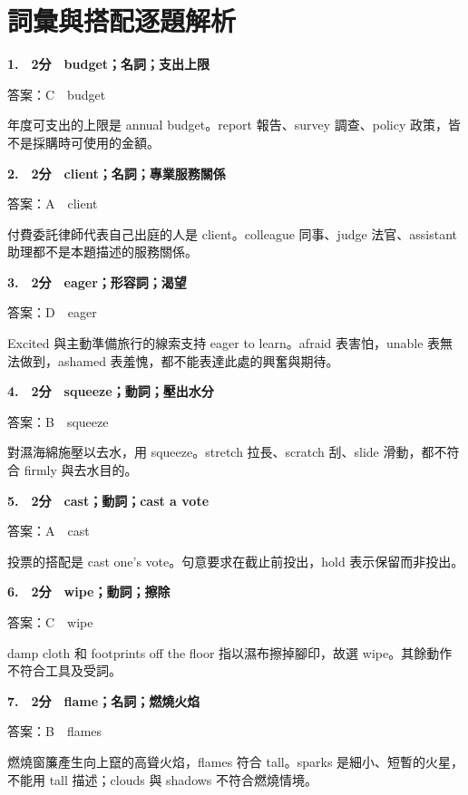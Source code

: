 \documentclass[11pt,a4paper]{article}
\begin{document}
\newpage
\section*{詞彙與搭配逐題解析}
\textbf{1.　2分　budget；名詞；支出上限}\par
答案：C　budget
\par\smallskip
年度可支出的上限是 annual budget。report 報告、survey 調查、policy 政策，皆不是採購時可使用的金額。
\par\smallskip
\medskip
{}\textbf{2.　2分　client；名詞；專業服務關係}\par
答案：A　client
\par\smallskip
付費委託律師代表自己出庭的人是 client。colleague 同事、judge 法官、assistant 助理都不是本題描述的服務關係。
\par\smallskip
\medskip
{}\textbf{3.　2分　eager；形容詞；渴望}\par
答案：D　eager
\par\smallskip
Excited 與主動準備旅行的線索支持 eager to learn。afraid 表害怕，unable 表無法做到，ashamed 表羞愧，都不能表達此處的興奮與期待。
\par\smallskip
\medskip
{}\textbf{4.　2分　squeeze；動詞；壓出水分}\par
答案：B　squeeze
\par\smallskip
對濕海綿施壓以去水，用 squeeze。stretch 拉長、scratch 刮、slide 滑動，都不符合 firmly 與去水目的。
\par\smallskip
\medskip
{}\textbf{5.　2分　cast；動詞；cast a vote}\par
答案：A　cast
\par\smallskip
投票的搭配是 cast one's vote。句意要求在截止前投出，hold 表示保留而非投出。
\par\smallskip
\medskip
{}\textbf{6.　2分　wipe；動詞；擦除}\par
答案：C　wipe
\par\smallskip
damp cloth 和 footprints off the floor 指以濕布擦掉腳印，故選 wipe。其餘動作不符合工具及受詞。
\par\smallskip
\medskip
{}\textbf{7.　2分　flame；名詞；燃燒火焰}\par
答案：B　flames
\par\smallskip
燃燒窗簾產生向上竄的高聳火焰，flames 符合 tall。sparks 是細小、短暫的火星，不能用 tall 描述；clouds 與 shadows 不符合燃燒情境。
\par\smallskip
\end{document}

